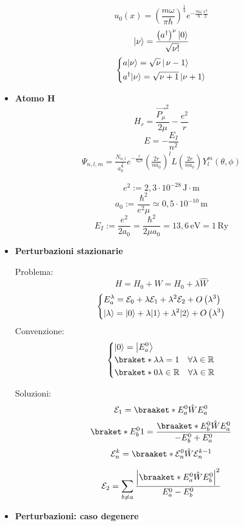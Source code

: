 \documentclass{article}
\DeclarePairedDelimiter\ket{\lvert}{\rangle}
\begin{document}
\begin{small}
\begin{multicols*}{3}
\begin{itemize}[leftmargin=*]
		\[u_0(x) = \left( \frac{m\omega }{\pi \hbar }\right)^{\frac{1}{4}} e^{-\frac{m\omega }{\hbar }\frac{x^2}{2}}\]
		\[\ket*{\nu } = \frac{\left(a^\dag\right)^\nu \ket*{0}}{\sqrt{\nu !}}\]
		\[
			\left\{\begin{aligned}
				&a\ket*{\nu } = \sqrt{\nu}\,\ket*{\,\mathrm{\nu -1}} \\
				& a^\dag\ket*{\nu } = \sqrt{\nu +1}\,\ket*{\nu +1}\\
			\end{aligned}\right.
		\]
	\item \textbf{Atomo H}
		\[H_r = \frac{\vec{P_\mu }^2}{2\mu } - \frac{e^2}{r}\]
		\[E=-\frac{E_I}{n^2}\]
		\begin{align*}\Psi _{n,l,m} = \frac{N_{n,l}}{a_0^{\frac{3}{2}}} e^{-\frac{r}{a_0n}} \left(\frac{2r}{na_0}\right)^l   L\left(\frac{2r}{na_0}\right) Y_l^m(\theta ,\phi )\end{align*}


		\[e^2 := 2,3\cdot 10^{-28}\,\mathrm{J\cdot m}\]
		\[a_0 := \frac{\hbar ^2}{e^2\mu } \simeq 0,5\cdot 10^{-10}\,\mathrm{m}\]
		\[E_I := \frac{e^2}{2a_0} = \frac{\hbar ^2}{2\mu a_0} = 13,6\,\mathrm{eV} = 1\,\mathrm{Ry}\]
	\item \textbf{Perturbazioni stazionarie}

		Problema:
		\[H= H_0+W = H_0+\lambda \hat{W}\]
		\[
			\left\{\begin{aligned}
				&E_a^\lambda = \mathcal{E}_0 + \lambda \mathcal{E}_1 + \lambda ^2\mathcal{E}_2 + O\left(\lambda ^3\right)\\
				&\ket*{\lambda } = \ket*{0} + \lambda \ket*{1} + \lambda ^2\ket*{2} + O\left(\lambda ^3\right)\\
			\end{aligned}\right.
		\]
		Convenzione:
		\[
			\left\{\begin{aligned}
				&\ket*{0}=\ket*{E_a^0}\\
				&\braket*{\lambda }{\lambda } = 1 \ \ \ \forall \lambda\in \mathbb{R} \\
				&\braket*{0}{\lambda }\in \mathbb{R}\ \ \ \forall \lambda \in \mathbb{R}
			\end{aligned}\right.
		\]

		Soluzioni:
		\[\mathcal{E}_1 = \braaket*{E_a^0}{\hat{W}}{E_a^0}\]
		\[\braket*{E_b^0}{1} = \frac{\braaket*{E_b^0}{\hat{W}}{E_a^0}}{-E_b^0 + E_a^0}\]
		\[\mathcal{E}_n^k = \braaket*{\mathcal{E}_n^0}{\hat{W}}{\mathcal{E}_n^{k-1}}\]

		\[\mathcal{E}_2 = \sum_{b\neq a} \frac{\left|\braaket*{E_a^0}{\hat{W}}{E_b^0}\right|^2}{E_a^0 - E_b^0}\]
	\item \textbf{Perturbazioni: caso degenere}


\end{itemize}
\end{multicols*}
\end{small}
\end{document}
